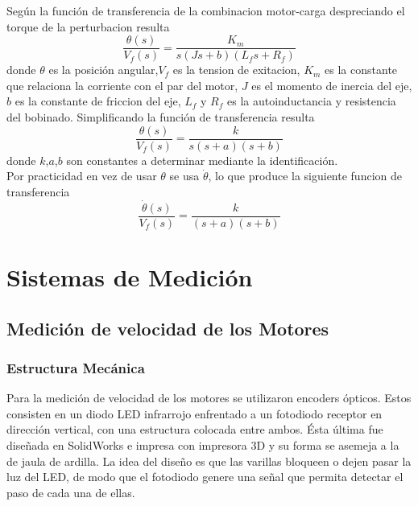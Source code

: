 \documentclass[10pt,conference,a4paper,onecolumn]{article}%
\begin{document}
 Según \cite{dorf} la función de transferencia de la combinacion motor-carga despreciando el torque de la perturbacion resulta
 \begin{equation}
 \frac{\theta(s)}{V_f(s)}=\frac{K_m}{s(Js+b)(L_fs+R_f)}
 \end{equation}
 donde $\theta$ es la posición angular,$V_f$ es la tension de exitacion, $K_m$ es la constante que relaciona la corriente con el par del motor, $J$ es el momento de inercia del eje, $b$ es la constante de friccion del eje, $L_f$  y $R_f$ es la autoinductancia y resistencia del bobinado. Simplificando la función de transferencia resulta
 \begin{equation}
 \frac{\theta(s)}{V_f(s)}=\frac{k}{s(s+a)(s+b)}
 \end{equation}
 donde $k$,$a$,$b$ son constantes a determinar mediante la identificación.\\
 Por practicidad en vez de usar $\theta$ se usa $\dot{\theta}$, lo que produce la siguiente funcion de transferencia
 \begin{equation}
 \frac{\dot{\theta}(s)}{V_f(s)}=\frac{k}{(s+a)(s+b)}
 \end{equation}
  
\section{Sistemas de Medición}
\subsection{Medición de velocidad de los Motores}
\subsubsection{Estructura Mecánica}
Para la medición de velocidad de los motores se utilizaron encoders ópticos. Estos consisten en un diodo LED infrarrojo enfrentado a un fotodiodo receptor en dirección vertical, con una estructura colocada entre ambos. Ésta última fue diseñada en SolidWorks e impresa con impresora 3D y su forma se asemeja a la de jaula de ardilla. La idea del diseño es que las varillas bloqueen o dejen pasar la luz del LED, de modo que el fotodiodo genere una señal que permita detectar el paso de cada una de ellas.
\end{document}
